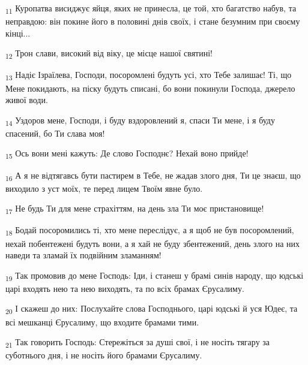 \begin{tcolorbox}
\textsubscript{11} Куропатва висиджує яйця, яких не принесла, це той, хто багатство набув, та неправдою: він покине його в половині днів своїх, і стане безумним при своєму кінці...
\end{tcolorbox}
\begin{tcolorbox}
\textsubscript{12} Трон слави, високий від віку, це місце нашої святині!
\end{tcolorbox}
\begin{tcolorbox}
\textsubscript{13} Надіє Ізраїлева, Господи, посоромлені будуть усі, хто Тебе залишає! Ті, що Мене покидають, на піску будуть списані, бо вони покинули Господа, джерело живої води.
\end{tcolorbox}
\begin{tcolorbox}
\textsubscript{14} Уздоров мене, Господи, і буду вздоровлений я, спаси Ти мене, і я буду спасений, бо Ти слава моя!
\end{tcolorbox}
\begin{tcolorbox}
\textsubscript{15} Ось вони мені кажуть: Де слово Господнє? Нехай воно прийде!
\end{tcolorbox}
\begin{tcolorbox}
\textsubscript{16} А я не відтягавсь бути пастирем в Тебе, не жадав злого дня, Ти це знаєш, що виходило з уст моїх, те перед лицем Твоїм явне було.
\end{tcolorbox}
\begin{tcolorbox}
\textsubscript{17} Не будь Ти для мене страхіттям, на день зла Ти моє пристановище!
\end{tcolorbox}
\begin{tcolorbox}
\textsubscript{18} Бодай посоромились ті, хто мене переслідує, а я щоб не був посоромлений, нехай побентежені будуть вони, а я хай не буду збентежений, день злого на них наведи та зламай їх подвійним зламанням!
\end{tcolorbox}
\begin{tcolorbox}
\textsubscript{19} Так промовив до мене Господь: Іди, і станеш у брамі синів народу, що юдські царі входять нею та нею виходять, та по всіх брамах Єрусалиму.
\end{tcolorbox}
\begin{tcolorbox}
\textsubscript{20} І скажеш до них: Послухайте слова Господнього, царі юдські й уся Юдеє, та всі мешканці Єрусалиму, що входите брамами тими.
\end{tcolorbox}
\begin{tcolorbox}
\textsubscript{21} Так говорить Господь: Стережіться за душі свої, і не носіть тягару за суботнього дня, і не носіть його брамами Єрусалиму.
\end{tcolorbox}
